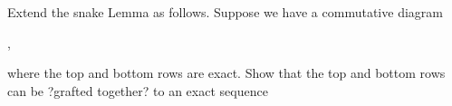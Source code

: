 \begin{exr}
Extend the snake Lemma as follows. Suppose we have a commutative diagram
\begin{center}
,
\end{center}
where the top and bottom rows are exact. Show that the top and bottom rows can
be ?grafted together? to an exact sequence
\begin{center}
\end{center}
\end{exr}
